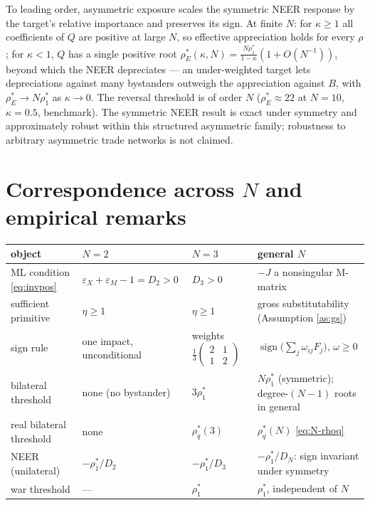 \documentclass[11pt]{article}
\begin{document}
\noindent To leading order, asymmetric exposure scales the symmetric NEER response by the target's relative importance and preserves its sign. At finite $N$: for $\kappa \geq 1$ all coefficients of $Q$ are positive at large $N$, so effective appreciation holds for every $\rho$; for $\kappa < 1$, $Q$ has a single positive root $\rho_E^*(\kappa, N) = \tfrac{N\rho_1^*}{1-\kappa}(1 + O(N^{-1}))$, beyond which the NEER depreciates --- an under-weighted target lets depreciations against many bystanders outweigh the appreciation against $B$, with $\rho_E^* \to N\rho_1^*$ as $\kappa \to 0$. The reversal threshold is of order $N$ ($\rho_E^* \approx 22$ at $N = 10$, $\kappa = 0.5$, benchmark). The symmetric NEER result is exact under symmetry and approximately robust within this structured asymmetric family; robustness to arbitrary asymmetric trade networks is not claimed.

\section{Correspondence across $N$ and empirical remarks}

\begin{center}
\begin{tabular}{p{3.6cm}p{3.0cm}p{3.4cm}p{4.2cm}}
\toprule
object & $N = 2$ & $N = 3$ & general $N$ \\
\midrule
ML condition \eqref{eq:invpos} & $\varepsilon_X + \varepsilon_M - 1 = D_2 > 0$ & $D_3 > 0$ & $-J$ a nonsingular M-matrix \\[3pt]
sufficient primitive & $\eta \geq 1$ & $\eta \geq 1$ & gross substitutability (Assumption \ref{as:gs}) \\[3pt]
sign rule & one impact, unconditional & weights $\tfrac{1}{3}\left(\begin{smallmatrix} 2 & 1 \\ 1 & 2\end{smallmatrix}\right)$ & $\operatorname{sign}\big(\sum_j \omega_{ij}F_j\big)$, $\omega \geq 0$ \\[3pt]
bilateral threshold & none (no bystander) & $3\rho_1^*$ & $N\rho_1^*$ (symmetric); degree-$(N-1)$ roots in general \\[3pt]
real bilateral threshold & none & $\rho_q^*(3)$ & $\rho_q^*(N)$ \eqref{eq:N-rhoq} \\[3pt]
NEER (unilateral) & $-\rho_1^*/D_2$ & $-\rho_1^*/D_3$ & $-\rho_1^*/D_N$: sign invariant under symmetry \\[3pt]
war threshold & --- & $\rho_1^*$ & $\rho_1^*$, independent of $N$ \\
\bottomrule
\end{tabular}
\end{center}
\end{document}
